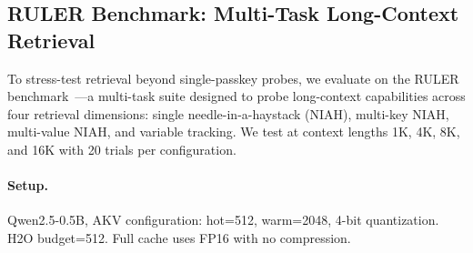 \documentclass[11pt,a4paper]{article}
\begin{document}
\subsection{RULER Benchmark: Multi-Task Long-Context Retrieval}
\label{sec:ruler}
\label{sec:ruler-limits}

To stress-test retrieval beyond single-passkey probes, we evaluate on the RULER benchmark~\cite{ruler}---a multi-task suite designed to probe long-context capabilities across four retrieval dimensions: single needle-in-a-haystack (NIAH), multi-key NIAH, multi-value NIAH, and variable tracking. We test at context lengths 1K, 4K, 8K, and 16K with 20 trials per configuration.

\paragraph{Setup.} Qwen2.5-0.5B, AKV configuration: hot=512, warm=2048, 4-bit quantization. H2O budget=512. Full cache uses FP16 with no compression.
\end{document}
